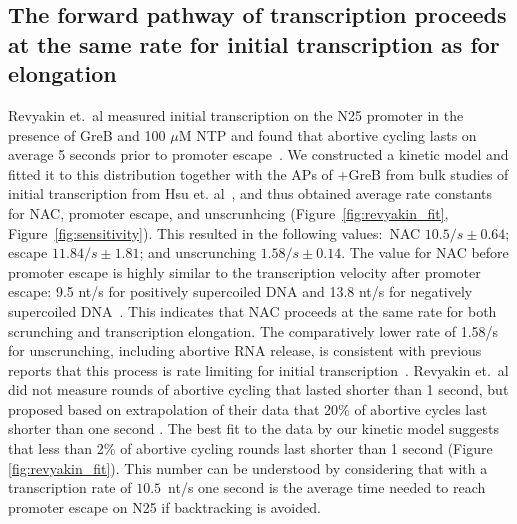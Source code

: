 %
\subsection{The forward pathway of transcription proceeds at the same rate
for initial transcription as for elongation}
Revyakin et.\ al measured initial transcription on the N25 promoter in the
presence of GreB and 100 $\mu$M NTP and found that abortive cycling lasts on
average 5 seconds prior to promoter escape~\cite{revyakin_abortive_2006}. We
constructed a kinetic model and fitted it to this distribution together with the
APs of +GreB from bulk studies of initial transcription from
Hsu et. al~\cite{hsu_initial_2006}, and thus obtained average rate constants
for NAC, promoter escape, and unscrunhcing (Figure~\ref{fig:revyakin_fit},
Figure~\ref{fig:sensitivity}). This resulted in the following values:~NAC
$10.5/s \pm 0.64$; escape $11.84/s \pm 1.81$; and unscrunching $1.58/s \pm
0.14$. The value for NAC before promoter escape is highly similar to the
transcription velocity after promoter escape: 9.5 nt/s for positively
supercoiled DNA and 13.8 nt/s for negatively supercoiled
DNA~\cite{revyakin_abortive_2006}. This indicates that NAC proceeds at the
same rate for both scrunching and transcription elongation. The comparatively
lower rate of 1.58/s for unscrunching, including abortive RNA release, is
consistent with previous reports that this process is rate limiting for
initial transcription~\cite{margeat_direct_2006, revyakin_abortive_2006}.
Revyakin et.\ al did not measure rounds of abortive cycling that lasted
shorter than 1 second, but proposed based on extrapolation of their data that
20\% of abortive cycles last shorter than one second
\cite{revyakin_abortive_2006}. The best fit to the data by our kinetic model
suggests that less than 2\% of abortive cycling rounds last shorter than 1
second (Figure \ref{fig:revyakin_fit}). This number can be understood by
considering that with a transcription rate of $10.5$~nt/s one second is the
average time needed to reach promoter escape on N25 if backtracking is
avoided.

